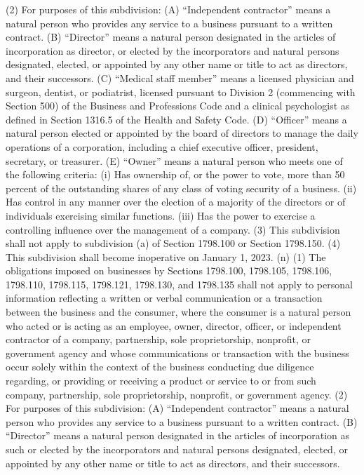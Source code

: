 (2) For purposes of this subdivision:
(A) “Independent contractor” means a natural person who provides any service to a business pursuant to a written contract.
(B) “Director” means a natural person designated in the articles of incorporation as director, or elected by the incorporators and natural persons designated, elected, or appointed by any other name or title to act as directors, and their successors.
(C) “Medical staff member” means a licensed physician and surgeon, dentist, or podiatrist, licensed pursuant to Division 2 (commencing with Section 500) of the Business and Professions Code and a clinical psychologist as defined in Section 1316.5 of the Health and Safety Code.
(D) “Officer” means a natural person elected or appointed by the board of directors to manage the daily operations of a corporation, including a chief executive officer, president, secretary, or treasurer.
(E) “Owner” means a natural person who meets one of the following criteria:
(i) Has ownership of, or the power to vote, more than 50 percent of the outstanding shares of any class of voting security of a business.
(ii) Has control in any manner over the election of a majority of the directors or of individuals exercising similar functions.
(iii) Has the power to exercise a controlling influence over the management of a company.
(3) This subdivision shall not apply to subdivision (a) of Section 1798.100 or Section 1798.150.
(4) This subdivision shall become inoperative on January 1, 2023.
(n) (1) The obligations imposed on businesses by Sections 1798.100, 1798.105, 1798.106, 1798.110, 1798.115, 1798.121, 1798.130, and 1798.135 shall not apply to personal information reflecting a written or verbal communication or a transaction between the business and the consumer, where the consumer is a natural person who acted or is acting as an employee, owner, director, officer, or independent contractor of a company, partnership, sole proprietorship, nonprofit, or government agency and whose communications or transaction with the business occur solely within the context of the business conducting due diligence regarding, or providing or receiving a product or service to or from such company, partnership, sole proprietorship, nonprofit, or government agency.
(2) For purposes of this subdivision:
(A) “Independent contractor” means a natural person who provides any service to a business pursuant to a written contract.
(B) “Director” means a natural person designated in the articles of incorporation as such or elected by the incorporators and natural persons designated, elected, or appointed by any other name or title to act as directors, and their successors.
